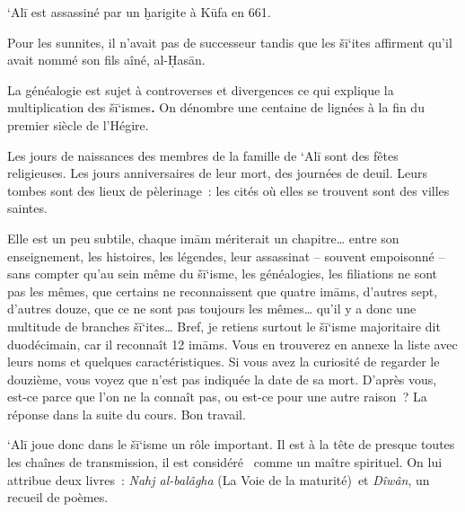 `Alī est assassiné par un ḫarigite à Kūfa en 661.

Pour les sunnites, il n'avait pas de successeur tandis que les šī`ites
affirment qu'il avait nommé son fils aîné, al-Ḥasān.


La généalogie est sujet à controverses et divergences ce qui explique la
multiplication des šī`ismes\textbf{.} On dénombre une centaine de
lignées à la fin du premier siècle de l'Hégire.

Les jours de naissances des membres de la famille de `Alī sont des fêtes
religieuses. Les jours anniversaires de leur mort, des journées de
deuil. Leurs tombes sont des lieux de pèlerinage~: les cités où elles se
trouvent sont des villes saintes.

Elle est un peu subtile, chaque imām mériterait un chapitre\ldots{}
entre son enseignement, les histoires, les légendes, leur assassinat --
souvent empoisonné -- sans compter qu'au sein même du šī`isme, les
généalogies, les filiations ne sont pas les mêmes, que certains ne
reconnaissent que quatre imāms, d'autres sept, d'autres douze, que ce ne
sont pas toujours les mêmes\ldots{} qu'il y a donc une multitude de
branches šī`ites\ldots{} Bref, je retiens surtout le šī`isme majoritaire
dit duodécimain, car il reconnaît 12 imāms. Vous en trouverez en annexe
la liste avec leurs noms et quelques caractéristiques. Si vous avez la
curiosité de regarder le douzième, vous voyez que n'est pas indiquée la
date de sa mort. D'après vous, est-ce parce que l'on ne la connaît pas,
ou est-ce pour une autre raison~? La réponse dans la suite du cours. Bon
travail.


`Alī joue donc dans le šī`isme un rôle important. Il est à la tête de
presque toutes les chaînes de transmission, il est considéré ~comme un
maître spirituel. On lui attribue deux livres~: \emph{Nahj al-balâgha}
(La Voie de la maturité)~et \emph{Dîwân}, un recueil de poèmes.

